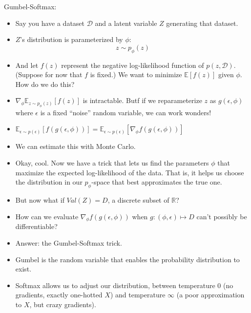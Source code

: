 \documentclass[11pt]{extarticle}
\newcommand{\Ex}[1]{{\mathbb E}\left[#1\right]}
\def \R {{\mathbb R}}
\def \E {{\mathbb E}}
\begin{document}
  Gumbel-Softmax:
  \begin{itemize}
    \item Say you have a dataset $\mathcal D$ and a latent variable $Z$ generating that dataset.  

    \item $Z$'s distribution is parameterized by $\phi$: 
    $$z \sim p_\phi(z)$$
    
    \item And let $f(z)$ represent the negative log-likelihood function of $p(z, \mathcal D)$. (Suppose for now that $f$ is fixed.) We want to minimize $\Ex{f(z)}$ given $\phi$. How do we do this?
    
    \item $\nabla_\phi \E_{z \sim p_\phi(z)} \left[f(z)\right]$ is intractable. Butf if we reparameterize $z$ as $g(\epsilon, \phi)$ where $\epsilon$ is a fixed ``noise'' random variable, we can work wonders!

    \item $\E_{\epsilon \sim p(\epsilon)} \left[f(g(\epsilon, \phi))\right] = \E_{\epsilon \sim p(\epsilon)} \left[\nabla_\phi f(g(\epsilon, \phi))\right]$

    \item We can estimate this with Monte Carlo.

    \item Okay, cool. Now we have a trick that lets us find the parameters $\phi$ that maximize the expected log-likelihood of the data. That is, it helps us choose the distribution in our $p_\phi$-space that best approximates the true one.

    \item But now what if $Val(Z) = D$, a discrete subset of $\R$?

    \item How can we evaluate $\nabla_\phi f(g(\epsilon, \phi))$ when $g: (\phi, \epsilon) \mapsto D$ can't possibly be differentiable?

    \item Answer: the Gumbel-Softmax trick. 

    \item Gumbel is the random variable that enables the probability distribution to exist.

    \item Softmax allows us to adjust our distribution, between temperature 0 (no gradients, exactly one-hotted $X$) and temperature $\infty$ (a poor approximation to $X$, but crazy gradients).
    

\end{itemize}
\end{document}

